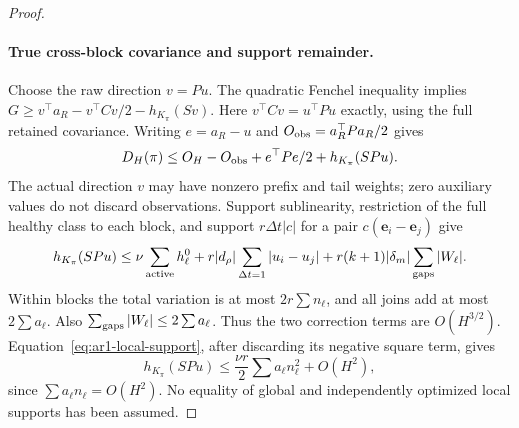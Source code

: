 \begin{proof}
\paragraph{True cross-block covariance and support remainder.}
Choose the raw direction $v=Pu$. The quadratic Fenchel inequality implies
$G\ge v^\top a_R-v^\top Cv/2-h_{K_\pi}(Sv)$.
Here $v^\top Cv=u^\top Pu$ exactly, using the full retained covariance.
Writing $e=a_R-u$ and $O_{\rm obs}=a_R^\top Pa_R/2$ gives
\begin{equation}\label{eq:ar1-dual-deficit}
 D_H(\pi)\le O_H-O_{\rm obs}+e^\top Pe/2+h_{K_\pi}(SPu).
\end{equation}
The actual direction $v$ may have nonzero prefix and tail weights; zero
auxiliary values do not discard observations.
Support sublinearity, restriction of the full healthy class to each block,
and support $r\Delta t|c|$ for a pair $c(\mathbf e_i-\mathbf e_j)$ give
\begin{equation}\label{eq:ar1-support-bound}
 h_{K_\pi}(SPu)\le\nu\sum_{\rm active}h_\ell^0
 +r|d_\rho|\sum_{\Delta t=1}|u_i-u_j|
 +r(k+1)|\delta_m|\sum_{\rm gaps}|W_\ell|.
\end{equation}
Within blocks the total variation is at most $2r\sum n_\ell$, and all joins
add at most $2\sum a_\ell$. Also $\sum_{\rm gaps}|W_\ell|\le2\sum a_\ell$.
Thus the two correction terms are $O(H^{3/2})$.
Equation~\eqref{eq:ar1-local-support}, after discarding its negative square
term, gives
\begin{equation}\label{eq:ar1-support-leading}
 h_{K_\pi}(SPu)\le\frac{\nu r}{2}\sum a_\ell n_\ell^2+O(H^2),
\end{equation}
since $\sum a_\ell n_\ell=O(H^2)$. No equality of global and independently
optimized local supports has been assumed.


\end{proof}
